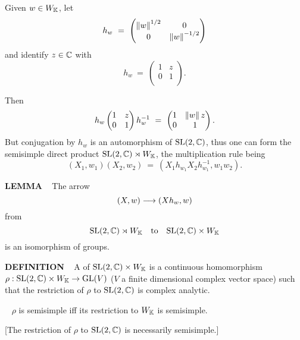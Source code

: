 Given $w \in W_{\mathbb{K}}$, let 
\[
h_w \ = \ 
\begin{pmatrix}
\norm{w}^{1/2} &0\\
0 &\norm{w}^{-1/2}\\
\end{pmatrix}
\]
and identify $z \in \mathbb{C}$ with 
\[
h_w \ = \ 
\begin{pmatrix}
1 &z\\
0 &1\\
\end{pmatrix}
.
\]

Then
\[
h_w 
\begin{pmatrix}
1 &z\\
0 &1\\
\end{pmatrix}
h_w^{-1}
\ = \ 
\begin{pmatrix}
1 &\norm{w}z\\
0 &1\\
\end{pmatrix}
.
\]
But  conjugation by $h_w$ is an automorphism of $\text{SL}(2,\mathbb{C})$, thus one can form the semisimple direct product 
$\text{SL}(2,\mathbb{C}) \rtimes W_{\mathbb{K}}$, the multiplication rule being 
\[
(X_1, w_1) (X_2, w_2) \ = \ (X_1 h_{w_1} X_2 h_{w_1}^{-1}, w_1 w_2).
\]

\vspace{0.1cm}


\begin{x}{\small\bf LEMMA} \ %
The arrow 
\[
(X,w) \longrightarrow (Xh_w,w)
\]
from 
\[
\text{SL}(2,\mathbb{C}) \rtimes W_{\mathbb{K}} \quad \text{to} \quad \text{SL}(2,\mathbb{C}) \times W_{\mathbb{K}}
\]
is an isomorphism of groups.
\end{x}

\vspace{0.1cm}

\begin{x}{\small\bf DEFINITION} \ %
A 
of $\text{SL}(2,\mathbb{C}) \times W_{\mathbb{K}}$ is a continuous homomorphism 
$\rho:\text{SL}(2,\mathbb{C}) \times W_{\mathbb{K}} \rightarrow \text{GL}(V)$ ($V$ a finite dimensional complex vector space) such that the restriction of $\rho$ to 
$\text{SL}(2,\mathbb{C})$ is complex analytic.
\end{x}

\vspace{0.1cm}



\begin{x}{\small\bf {}} \ %
$\rho$ is semisimple iff its restriction to $W_{\mathbb{K}}$ is semisimple.  

\vspace{0.1cm}

[The restriction of $\rho$ to $\text{SL}(2,\mathbb{C})$ is necessarily semisimple.]
\end{x}

